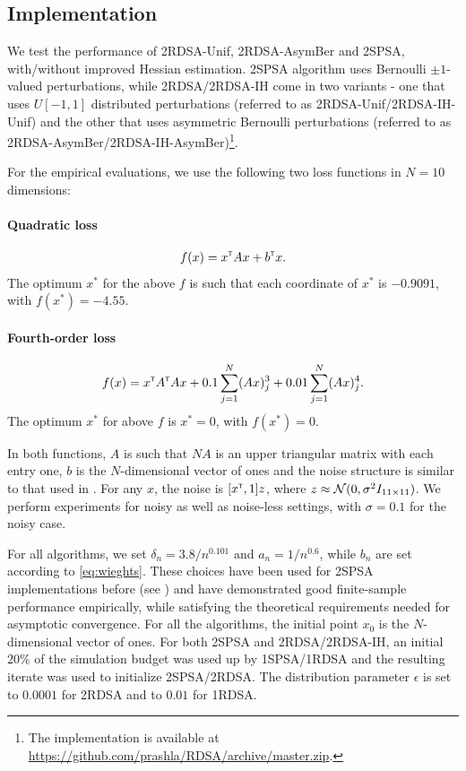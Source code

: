 \documentclass[letterpaper, 10 pt, conference]{ieeeconf}  %
\begin{document}
\subsection{Implementation}
We test the performance of 2RDSA-Unif, 2RDSA-AsymBer and 2SPSA, with/without improved Hessian estimation. 
2SPSA algorithm uses Bernoulli $\pm 1$-valued perturbations, while 2RDSA/2RDSA-IH come in two variants - one that uses $U[-1,1]$ distributed perturbations (referred to as 2RDSA-Unif/2RDSA-IH-Unif) and the other that uses asymmetric Bernoulli perturbations (referred to as 2RDSA-AsymBer/2RDSA-IH-AsymBer)\footnote{The implementation is available at \url{https://github.com/prashla/RDSA/archive/master.zip}.}.

For the empirical evaluations, we use the following two loss functions in $N=10$ dimensions:
\paragraph{Quadratic loss}
\begin{align}
f(x) = x^\mathsf{\scriptscriptstyle T} A x + b^\mathsf{\scriptscriptstyle T} x.\label{eq:quadratic}
\end{align} 
The optimum $x^*$ for the above $f$ is such that each coordinate of $x^*$ is $-0.9091$, with $f(x^*) = -4.55$.

\paragraph{Fourth-order loss}
\begin{align} 
f(x) = x^\mathsf{\scriptscriptstyle T} A^\mathsf{\scriptscriptstyle T} A x + 0.1 \sum_{j=1}^N (Ax)^3_j + 0.01 \sum_{j=1}^N (Ax)^4_j.\label{eq:4thorder}
 \end{align} 
The optimum $x^*$ for above $f$ is $x^*=0$, with $f(x^*) = 0$. 

In both functions, $A$ is such that $NA$ is an upper triangular matrix with each entry one, $b$ is the $N$-dimensional vector of ones and the noise structure is similar to that used in \cite{spall_adaptive}. For any $x$, the noise is $[x^\mathsf{\scriptscriptstyle T}, 1]z$, where $z \approx \mathcal{N}(0,\sigma^2 I_{11\times11})$. We perform experiments for noisy as well as noise-less settings, with $\sigma=0.1$ for the noisy case. 



For all algorithms, we set $\delta_n = 3.8/n^{0.101}$ and $a_n = 1/n^{0.6}$, while $b_n$ are set according to \eqref{eq:wieghts}. These choices have been used  for 2SPSA implementations before (see \cite{spall_adaptive}) and have demonstrated good finite-sample performance empirically, while satisfying the theoretical requirements needed for asymptotic convergence.  For all the algorithms, the initial point $x_0$ is the $N$-dimensional vector of ones.  For both 2SPSA and 2RDSA/2RDSA-IH, an initial $20\%$ of the  simulation budget was used up by 1SPSA/1RDSA and the resulting iterate was used to initialize 2SPSA/2RDSA. The distribution parameter $\epsilon$ is set to $0.0001$ for 2RDSA and to $0.01$ for 1RDSA. 
\end{document}
